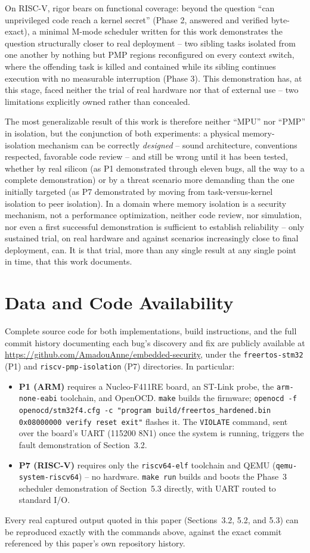 \documentclass[sigconf,nonacm]{acmart}
\begin{document}
On RISC-V, rigor bears on functional coverage: beyond the question ``can unprivileged code reach a kernel secret'' (Phase 2, answered and verified byte-exact), a minimal M-mode scheduler written for this work demonstrates the question structurally closer to real deployment -- two sibling tasks isolated from one another by nothing but PMP regions reconfigured on every context switch, where the offending task is killed and contained while its sibling continues execution with no measurable interruption (Phase 3). This demonstration has, at this stage, faced neither the trial of real hardware nor that of external use -- two limitations explicitly owned rather than concealed.

The most generalizable result of this work is therefore neither ``MPU'' nor ``PMP'' in isolation, but the conjunction of both experiments: a physical memory-isolation mechanism can be correctly \emph{designed} -- sound architecture, conventions respected, favorable code review -- and still be wrong until it has been tested, whether by real silicon (as P1 demonstrated through eleven bugs, all the way to a complete demonstration) or by a threat scenario more demanding than the one initially targeted (as P7 demonstrated by moving from task-versus-kernel isolation to peer isolation). In a domain where memory isolation is a security mechanism, not a performance optimization, neither code review, nor simulation, nor even a first successful demonstration is sufficient to establish reliability -- only sustained trial, on real hardware and against scenarios increasingly close to final deployment, can. It is that trial, more than any single result at any single point in time, that this work documents.

\section*{Data and Code Availability}

Complete source code for both implementations, build instructions, and the full commit history documenting each bug's discovery and fix are publicly available at \url{https://github.com/AmadouAnne/embedded-security}, under the \texttt{freertos-stm32} (P1) and \texttt{riscv-pmp-isolation} (P7) directories. In particular:

\begin{itemize}
  \item \textbf{P1 (ARM)} requires a Nucleo-F411RE board, an ST-Link probe, the \texttt{arm-none-eabi} toolchain, and OpenOCD. \texttt{make} builds the firmware; \texttt{openocd -f openocd/stm32f4.cfg -c "program build/freertos\_hardened.bin 0x08000000 verify reset exit"} flashes it. The \texttt{VIOLATE} command, sent over the board's UART (115200 8N1) once the system is running, triggers the fault demonstration of Section~3.2.
  \item \textbf{P7 (RISC-V)} requires only the \texttt{riscv64-elf} toolchain and QEMU (\texttt{qemu-system-riscv64}) -- no hardware. \texttt{make run} builds and boots the Phase~3 scheduler demonstration of Section~5.3 directly, with UART routed to standard I/O.
\end{itemize}

Every real captured output quoted in this paper (Sections~3.2, 5.2, and 5.3) can be reproduced exactly with the commands above, against the exact commit referenced by this paper's own repository history.



\end{document}
